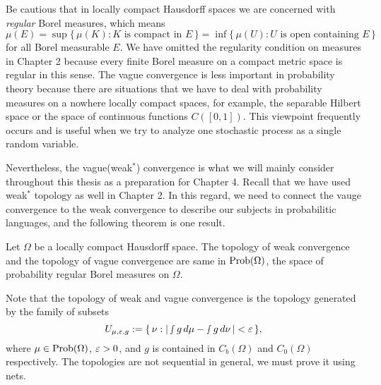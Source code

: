 \documentclass[10pt]{article}
\begin{document}
Be cautious that in locally compact Hausdorff spaces we are concerned with \emph{regular} Borel measures, which means
\[\mu(E)=\sup\{\,\mu(K):K\text{ is compact in }E\,\}
=\inf\{\,\mu(U):U\text{ is open containing }E\,\}\]
for all Borel measurable $E$.
We have omitted the regularity condition on measures in Chapter 2 because every finite Borel measure on a compact metric space is regular in this sense.
The vague convergence is less important in probability theory because there are situations that we have to deal with probability measures on a nowhere locally compact spaces, for example, the separable Hilbert space or the space of continuous functions $C([0,1])$.
This viewpoint frequently occurs and is useful when we try to analyze one stochastic process as a single random variable.

Nevertheless, the vague(weak$^*$) convergence is what we will mainly consider throughout this thesis as a preparation for Chapter 4.
Recall that we have used weak$^*$ topology as well in Chapter 2.
In this regard, we need to connect the vauge convergence to the weak convergence to describe our subjects in probabilitic languages, and the following theorem is one result.

\begin{thm}
Let $\Omega$ be a locally compact Hausdorff space.
The topology of weak convergence and the topology of vague convergence are same in $\operatorname{Prob}(\Omega)$, the space of probability regular Borel measures on $\Omega$.
\end{thm}

Note that the topology of weak and vague convergence is the topology generated by the family of subsets
\[U_{\mu,\varepsilon,g}:=\{\,\nu:|\smallint g\,d\mu-\smallint g\,d\nu\,|<\varepsilon\,\},\]
where $\mu\in\operatorname{Prob}(\Omega)$, $\varepsilon>0$, and $g$ is contained in $C_b(\Omega)$ and $C_0(\Omega)$ respectively.
The topologies are not sequential in general, we must prove it using nets.
\end{document}
